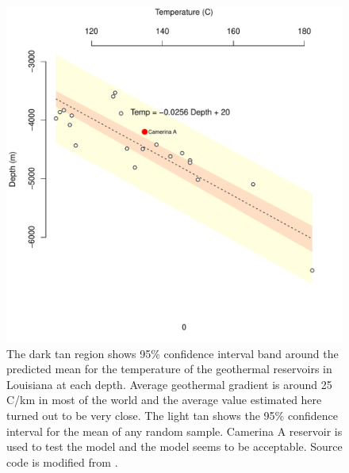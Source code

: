 \documentclass[review,authoryear, 12pt]{elsarticle}\usepackage[]{graphicx}\usepackage[]{color}
\makeatletter
\def\maxwidth{ %
  \ifdim\Gin@nat@width>\linewidth
    \linewidth
  \else
    \Gin@nat@width
  \fi
}
\newenvironment{knitrout}{}{} %
\makeatother
\begin{document}
\begin{knitrout}
\color{fgcolor}\begin{figure}[]

\includegraphics[width=\maxwidth]{figure/geothermal_gradient} \caption[The dark tan region shows 95\% confidence interval band around the predicted mean for the temperature of the geothermal reservoirs in Louisiana at each depth]{The dark tan region shows 95\% confidence interval band around the predicted mean for the temperature of the geothermal reservoirs in Louisiana at each depth. Average geothermal gradient is around 25 \degree C/km in most of the world \citep{fridleifsson2008possible} and the average value estimated here turned out to be very close. The light tan shows the 95\% confidence interval for the mean of any random sample. Camerina A reservoir is used to test the model and the model seems to be acceptable. Source code is modified from \citet{white_note}.\label{Fig:geothermal_gradient}}
\end{figure}


\end{knitrout}


\end{document}
